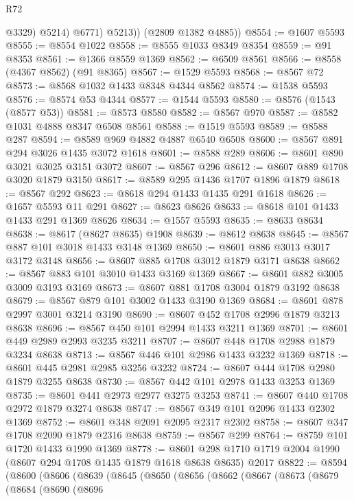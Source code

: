 \begin{lexlean}{R72}
\begin{coremodule}
                @3329)
              @5214)
            @6771)
          @5213))
      (@2809 @1382 @4885))
@8554 := @1607 @5593
@8555 := @8554 @1022
@8558 := @8555 @1033 @8349 @8354
@8559 := @91 @8353
@8561 := @1366 @8559 @1369
@8562 := @6509 @8561
@8566 := @8558 (@4367 @8562) (@91 @8365)
@8567 := @1529 @5593
@8568 := @8567 @72
@8573 := @8568 @1032 @1433 @8348 @4344 @8562
@8574 := @1538 @5593
@8576 := @8574 @53 @4344
@8577 := @1544 @5593
@8580 := @8576 (@1543 (@8577 @53))
@8581 := @8573 @8580
@8582 := @8567 @970
@8587 := @8582 @1031 @4888 @8347 @6508 @8561
@8588 := @1519 @5593
@8589 := @8588 @287
@8594 := @8589 @969 @4882 @4887 @6540 @6508
@8600 := @8567 @891 @294 @3026 @1435 @3072 @1618
@8601 := @8588 @289
@8606 := @8601 @890 @3021 @3025 @3151 @3072
@8607 := @8567 @296
@8612 := @8607 @889 @1708 @3020 @1879 @3150
@8617 := @8589 @295 @1436 @1707 @1896 @1879
@8618 := @8567 @292
@8623 := @8618 @294 @1433 @1435 @291 @1618
@8626 := @1657 @5593 @11 @291
@8627 := @8623 @8626
@8633 := @8618 @101 @1433 @1433 @291 @1369 @8626
@8634 := @1557 @5593
@8635 := @8633 @8634
@8638 := @8617 (@8627 @8635) @1908
@8639 := @8612 @8638
@8645 := @8567 @887 @101 @3018 @1433 @3148 @1369
@8650 := @8601 @886 @3013 @3017 @3172 @3148
@8656 := @8607 @885 @1708 @3012 @1879 @3171 @8638
@8662 := @8567 @883 @101 @3010 @1433 @3169 @1369
@8667 := @8601 @882 @3005 @3009 @3193 @3169
@8673 := @8607 @881 @1708 @3004 @1879 @3192 @8638
@8679 := @8567 @879 @101 @3002 @1433 @3190 @1369
@8684 := @8601 @878 @2997 @3001 @3214 @3190
@8690 := @8607 @452 @1708 @2996 @1879 @3213 @8638
@8696 := @8567 @450 @101 @2994 @1433 @3211 @1369
@8701 := @8601 @449 @2989 @2993 @3235 @3211
@8707 := @8607 @448 @1708 @2988 @1879 @3234 @8638
@8713 := @8567 @446 @101 @2986 @1433 @3232 @1369
@8718 := @8601 @445 @2981 @2985 @3256 @3232
@8724 := @8607 @444 @1708 @2980 @1879 @3255 @8638
@8730 := @8567 @442 @101 @2978 @1433 @3253 @1369
@8735 := @8601 @441 @2973 @2977 @3275 @3253
@8741 := @8607 @440 @1708 @2972 @1879 @3274 @8638
@8747 := @8567 @349 @101 @2096 @1433 @2302 @1369
@8752 := @8601 @348 @2091 @2095 @2317 @2302
@8758 := @8607 @347 @1708 @2090 @1879 @2316 @8638
@8759 := @8567 @299
@8764 := @8759 @101 @1720 @1433 @1990 @1369
@8778 := @8601 @298 @1710 @1719 @2004 @1990 (@8607 @294 @1708 @1435 @1879 @1618 @8638 @8635) @2017
@8822 := @8594
    (@8600
      (@8606
        (@8639
          (@8645
            (@8650
              (@8656
                (@8662
                  (@8667
                    (@8673
                      (@8679
                        (@8684
                          (@8690
                            (@8696

\end{coremodule}
\end{lexlean}
